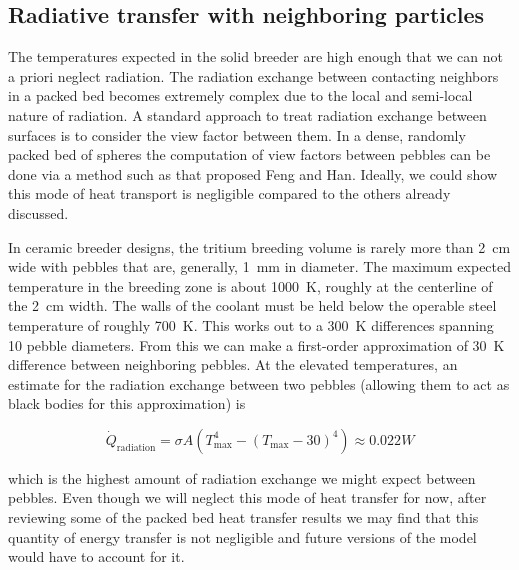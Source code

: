 \subsection{Radiative transfer with neighboring particles}

The temperatures expected in the solid breeder are high enough that we can not a priori neglect radiation. The radiation exchange between contacting neighbors in a packed bed becomes extremely complex due to the local and semi-local nature of radiation. A standard approach to treat radiation exchange between surfaces is to consider the view factor between them. In a dense, randomly packed bed of spheres the computation of view factors between pebbles can be done via a method such as that proposed Feng and Han\cite{Feng2012}. Ideally, we could show this mode of heat transport is negligible compared to the others already discussed.

In ceramic breeder designs, the tritium breeding volume is rarely more than \si{2 cm} wide with pebbles that are, generally, \si{1 mm} in diameter. The maximum expected temperature in the breeding zone is about \si{1000 K}, roughly at the centerline of the \si{2 cm} width. The walls of the coolant must be held below the operable steel temperature of roughly \si{700 K}. This works out to a \si{300 K} differences spanning 10 pebble diameters. From this we can make a first-order approximation of \si{30 K} difference between neighboring pebbles. At the elevated temperatures, an estimate for the radiation exchange between two pebbles (allowing them to act as black bodies for this approximation) is

\begin{equation}
	\dot{Q}_\text{radiation} = \sigma A \left(T_\text{max}^4 - (T_\text{max}-30)^4\right) \approx 0.022\si{W}
\end{equation}
 
 which is the highest amount of radiation exchange we might expect between pebbles. Even though we will neglect this mode of heat transfer for now, after reviewing some of the packed bed heat transfer results we may find that this quantity of energy transfer is not negligible and future versions of the model would have to account for it.